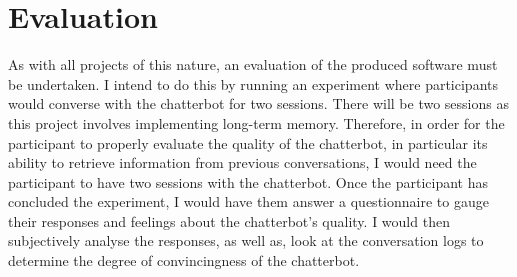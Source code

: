 %
%

\section*{Evaluation}
As with all projects of this nature, an evaluation of the produced software must be undertaken. I intend to do this by running an experiment where participants would converse with the chatterbot for two sessions. There will be two sessions as this project involves implementing long-term memory. Therefore, in order for the participant to properly evaluate the quality of the chatterbot, in particular its ability to retrieve information from previous conversations, I would need the participant to have two sessions with the chatterbot. Once the participant has concluded the experiment, I would have them answer a questionnaire to gauge their responses and feelings about the chatterbot's quality. I would then subjectively analyse the responses, as well as, look at the conversation logs to determine the degree of convincingness of the chatterbot.